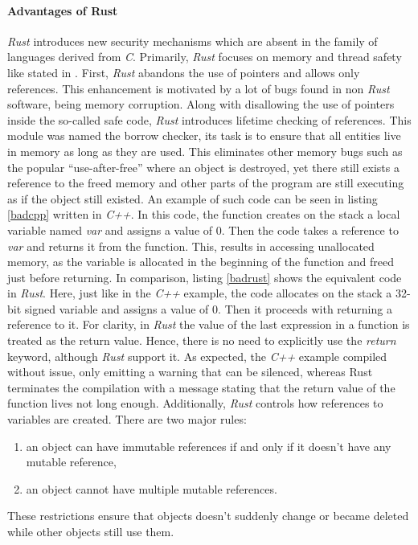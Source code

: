 \paragraph{Advantages of Rust}
\textit{Rust} introduces new security mechanisms which are absent in the family of languages derived from \textit{C}. Primarily, \textit{Rust} focuses on memory and thread safety like stated in \cite{rustmemorysafety}. First, \textit{Rust} abandons the use of pointers and allows only references. This enhancement is motivated by a lot of bugs found in non \textit{Rust} software, being memory corruption. Along with disallowing the use of pointers inside the so-called safe code, \textit{Rust} introduces lifetime checking of references. This module was named the borrow checker, its task is to ensure that all entities live in memory as long as they are used. This eliminates other memory bugs such as the popular “use-after-free” where an object is destroyed, yet there still exists a reference to the freed memory and other parts of the program are still executing as if the object still existed. An example of such code can be seen in listing \ref{badcpp} written in \textit{C++}. In this code, the function creates on the stack a local variable named \textit{var} and assigns a value of 0. Then the code takes a reference to \textit{var} and returns it from the function. This, results in accessing unallocated memory, as the variable is allocated in the beginning of the function and freed just before returning. In comparison, listing \ref{badrust} shows the equivalent code in \textit{Rust}. Here, just like in the \textit{C++} example, the code allocates on the stack a 32-bit signed variable and assigns a value of $0$. Then it proceeds with returning a reference to it. For clarity, in \textit{Rust} the value of the last expression in a function is treated as the return value. Hence, there is no need to explicitly use the \textit{return} keyword, although \textit{Rust} support it. As expected, the \textit{C++} example compiled without issue, only emitting a warning that can be silenced, whereas Rust terminates the compilation with a message stating that the return value of the function lives not long enough. Additionally, \textit{Rust} controls how references to variables are created. There are two major rules:
\begin{enumerate}
    \item an object can have immutable references if and only if it doesn't have any mutable reference,
    \item an object cannot have multiple mutable references.
\end{enumerate}
These restrictions ensure that objects doesn't suddenly change or became deleted while other objects still use them.

